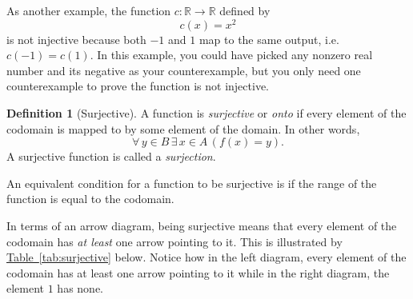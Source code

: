 \documentclass[11pt,oneside]{book}
\theoremstyle{definition}
\newtheorem{defn}[thm]{Definition}
\begin{document}
As another example, the function $c: \mathbb{R} \to \mathbb{R}$ defined by
\[ c(x) = x^{2} \]
is not injective because both $-1$ and $1$ map to the same output, i.e. $c(-1) = c(1)$.
In this example, you could have picked any nonzero real number and its negative as your counterexample, but you only need one counterexample to prove the function is not injective.

\begin{defn}[Surjective]
    A function is \emph{surjective} or \emph{onto} if every element of the codomain is mapped to by some element of the domain.
    In other words,
    \[ \forall\, y \in B\, \exists\, x \in A\, (f(x) = y). \]
    A surjective function is called a \emph{surjection}.
\end{defn}

An equivalent condition for a function to be surjective is if the range of the function is equal to the codomain.

In terms of an arrow diagram, being surjective means that every element of the codomain has \emph{at least} one arrow pointing to it.
This is illustrated by \hyperref[tab:surjective]{Table~\ref*{tab:surjective}} below.
Notice how in the left diagram, every element of the codomain has at least one arrow pointing to it while in the right diagram, the element $1$ has none.
\end{document}
